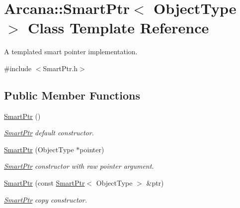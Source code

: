 \hypertarget{class_arcana_1_1_smart_ptr}{}\section{Arcana\+:\+:Smart\+Ptr$<$ Object\+Type $>$ Class Template Reference}
\label{class_arcana_1_1_smart_ptr}


A templated smart pointer implementation.  




{\ttfamily \#include $<$Smart\+Ptr.\+h$>$}

\subsection*{Public Member Functions}
\begin{DoxyCompactItemize}
\item 
\mbox{\label{class_arcana_1_1_smart_ptr_ac5402f3afb6aaec3488ce68dfc3cef90}} 
\mbox{\hyperlink{class_arcana_1_1_smart_ptr_ac5402f3afb6aaec3488ce68dfc3cef90}{Smart\+Ptr}} ()
\begin{DoxyCompactList}\small\item\em \mbox{\hyperlink{class_arcana_1_1_smart_ptr}{Smart\+Ptr}} default constructor. \end{DoxyCompactList}\item 
\mbox{\label{class_arcana_1_1_smart_ptr_a0b767e277796018d3c670bc4cd4339f6}} 
\mbox{\hyperlink{class_arcana_1_1_smart_ptr_a0b767e277796018d3c670bc4cd4339f6}{Smart\+Ptr}} (Object\+Type $\ast$pointer)
\begin{DoxyCompactList}\small\item\em \mbox{\hyperlink{class_arcana_1_1_smart_ptr}{Smart\+Ptr}} constructor with raw pointer argument. \end{DoxyCompactList}\item 
\mbox{\label{class_arcana_1_1_smart_ptr_ae43a5c6b6a9ad9b796fdc65a9b514dea}} 
\mbox{\hyperlink{class_arcana_1_1_smart_ptr_ae43a5c6b6a9ad9b796fdc65a9b514dea}{Smart\+Ptr}} (const \mbox{\hyperlink{class_arcana_1_1_smart_ptr}{Smart\+Ptr}}$<$ Object\+Type $>$ \&ptr)
\begin{DoxyCompactList}\small\item\em \mbox{\hyperlink{class_arcana_1_1_smart_ptr}{Smart\+Ptr}} copy constructor. \end{DoxyCompactList}\item 

\end{DoxyCompactItemize}
